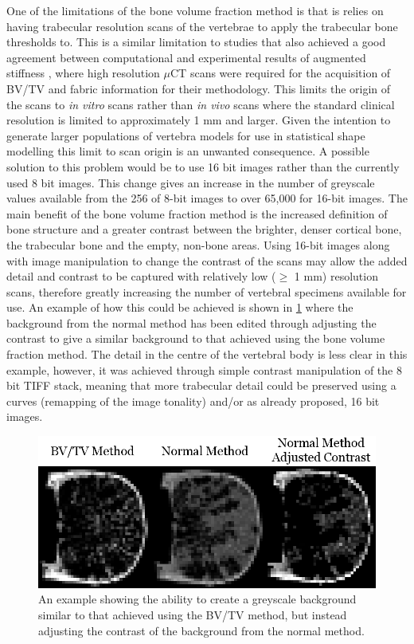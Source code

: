 One of the limitations of the bone volume fraction method is that is relies on
having trabecular resolution scans of the vertebrae to apply the trabecular
bone thresholds to. 
This is a similar limitation to studies that also achieved a good agreement
between computational and experimental results of augmented stiffness
\cite{kinzl2013experimentally}, where high resolution $\mu$CT scans were
required for the acquisition of BV/TV and fabric information for their
methodology.
This limits the origin of the scans to \textit{in vitro}
scans rather than \textit{in vivo} scans where the standard clinical resolution
is limited to approximately 1 mm and larger.  Given the intention to generate
larger populations of vertebra models for use in statistical shape modelling
this limit to scan origin is an unwanted consequence.  A possible solution to
this problem would be to use 16 bit images rather than the currently used 8 bit
images.  This change gives an increase in the number of greyscale values
available from the 256 of 8-bit images to over 65,000 for 16-bit images.  The
main benefit of the bone volume fraction method is the increased definition of
bone structure and a greater contrast between the brighter, denser cortical
bone, the trabecular bone and the empty, non-bone areas.  Using 16-bit images
along with image manipulation to change the contrast of the scans may allow the
added detail and contrast to be captured with relatively low ($\geq$ 1 mm)
resolution scans, therefore greatly increasing the number of vertebral
specimens available for use. An example of how this could be achieved is shown
in \cref{fig:adding_contrast} where the background from the normal method has
been edited through adjusting the contrast to give a similar background to that
achieved using the bone volume fraction method. The detail in the centre of the
vertebral body is less clear in this example, however, it was achieved through
simple contrast manipulation of the 8 bit TIFF stack, meaning that more
trabecular detail could be preserved using a curves (remapping of the image
tonality) and/or as already proposed, 16 bit images.

\begin{figure}[h!] \centering
	\includegraphics[width=.65\textwidth]{Chapters/Chapter_HT_images/adding_contrast.png}
	\caption{An example showing the ability to create a greyscale
		background similar to that achieved using the BV/TV method, but
		instead adjusting the contrast of the background from the
normal method.} \label{fig:adding_contrast} \end{figure}

